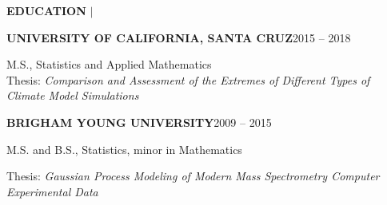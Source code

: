 \documentclass[12pt]{article}
\newcommand{\entrypar}[5]{
    \textbf{\MakeUppercase{#1}}\hfill #3 -- #4

    \textbf{#2}

    #5
    }
\begin{document}
\begin{minipage}[t]{0.19\textwidth}
    \begin{flushright}
        \textbf{EDUCATION} $\vert$ \ \
    \end{flushright}
\end{minipage}%
%
\begin{minipage}[t]{0.81\textwidth}
    \begin{flushleft}
        \entrypar{University of California, Santa Cruz}{\vspace{-12pt}}{2015}{2018}{M.S., Statistics and Applied Mathematics} \\
        \smallskip
        \smallskip
        Thesis: \emph{Comparison and Assessment of the Extremes of Different Types of Climate Model Simulations}

        \entrypar{Brigham Young University}{\vspace{-12pt}}{2009}{2015}{M.S. and B.S., Statistics, minor in Mathematics}

        Thesis: \emph{Gaussian Process Modeling of Modern Mass Spectrometry Computer Experimental Data}
    \end{flushleft}
\end{minipage}
\end{document}

